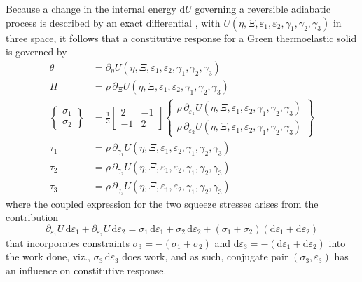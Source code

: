 Because a change in the internal energy $\mathrm{d} U$ governing a reversible adiabatic process is described by an exact differential \cite{Caratheodory09}, with $U( \eta, \Xi, \varepsilon_1 , \varepsilon_2 , \gamma_1 , \gamma_2 , \gamma_3 )$ in three space, it follows that a constitutive response for a Green thermo\-elastic solid is governed by \cite{Freed17}
\begin{subequations}
    \label{GreenThermoelasticSolid}
\begin{align}
\theta & = \partial_{\eta} U( \eta, \Xi, \varepsilon_1 , \varepsilon_2 , \gamma_1 , \gamma_2 , \gamma_3 ) \\
\Pi & = \rho \, \partial_{\Xi} U( \eta, \Xi, \varepsilon_1 , \varepsilon_2 , \gamma_1 , \gamma_2 , \gamma_3 )  \\
\left\{ \begin{matrix}
\sigma_1 \\ \sigma_2
\end{matrix} \right\} & = \frac{1}{3} \begin{bmatrix}
2 & -1 \\ -1 & 2
\end{bmatrix} \left\{ \begin{matrix}
\rho \, \partial_{\varepsilon_1} U( \eta, \Xi, \varepsilon_1 , \varepsilon_2 , \gamma_1 , \gamma_2 , \gamma_3 ) \\
\rho \, \partial_{\varepsilon_2} U( \eta, \Xi, \varepsilon_1 , \varepsilon_2 , \gamma_1 , \gamma_2 , \gamma_3 )
\end{matrix} \right\} \label{GreenThermoelasticSqueeze} \\
\tau_1 & = \rho \, \partial_{\gamma_1} U( \eta, \Xi, \varepsilon_1 , \varepsilon_2 , \gamma_1 , \gamma_2 , \gamma_3 ) \\
\tau_2 & = \rho \, \partial_{\gamma_2} U( \eta, \Xi, \varepsilon_1 , \varepsilon_2 , \gamma_1 , \gamma_2 , \gamma_3 ) \\
\tau_3 & = \rho \, \partial_{\gamma_3} U( \eta, \Xi, \varepsilon_1 , \varepsilon_2 , \gamma_1 , \gamma_2 , \gamma_3 ) 
\end{align}
\end{subequations}
where the coupled expression for the two squeeze stresses arises from the contribution
\begin{displaymath}
    \partial_{\varepsilon_1} U \, \mathrm{d} \varepsilon_1 +
    \partial_{\varepsilon_2} U \, \mathrm{d} \varepsilon_2 = 
    \sigma_1 \, \mathrm{d} \varepsilon_1 +
    \sigma_2 \, \mathrm{d} \varepsilon_2 + 
    (\sigma_1 + \sigma_2) (\mathrm{d} \varepsilon_1 + \mathrm{d} \varepsilon_2)
\end{displaymath}
that incorporates constraints $\sigma_3 = -(\sigma_1 + \sigma_2)$ and $\mathrm{d} \varepsilon_3 = -( \mathrm{d} \varepsilon_1 + \mathrm{d} \varepsilon_2 )$ into the work done, viz., $\sigma_3 \, \mathrm{d} \varepsilon_3$ does work, and as such, conjugate pair $( \sigma_3 , \varepsilon_3 )$ has an influence on constitutive response.

